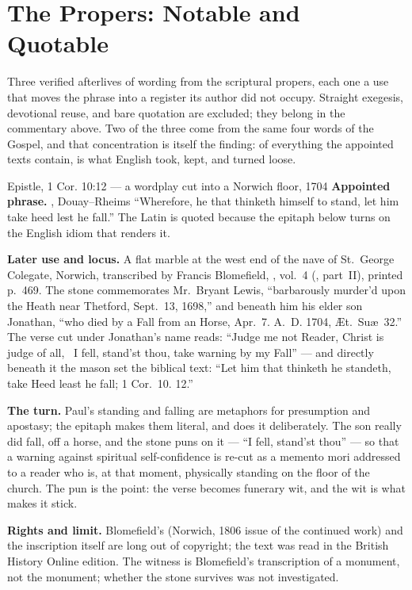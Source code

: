 \sectionguard
\section*{The Propers: Notable and Quotable}

Three verified afterlives of wording from the scriptural propers, each one a
use that moves the phrase into a register its author did not occupy. Straight
exegesis, devotional reuse, and bare quotation are excluded; they belong in
the commentary above. Two of the three come from the same four words of the
Gospel, and that concentration is itself the finding: of everything the
appointed texts contain,  is what English took, kept,
and turned loose.

\begin{afterlife}{Epistle, 1 Cor. 10:12 --- a wordplay cut into a Norwich floor, 1704}
\textbf{Appointed phrase.} , Douay--Rheims ``Wherefore, he that thinketh himself to stand, let him
take heed lest he fall.'' The Latin is quoted because the epitaph below turns
on the English idiom that renders it.

\textbf{Later use and locus.} A flat marble at the west end of the nave of
St.\ George Colegate, Norwich, transcribed by Francis Blomefield, , vol.~4
(, part~II), printed
p.~469. The stone commemorates Mr.\ Bryant Lewis, ``barbarously murder'd upon
the Heath near Thetford, Sept.\ 13, 1698,'' and beneath him his elder son
Jonathan, ``who died by a Fall from an Horse, Apr.\ 7. A.~D. 1704, \AE t.\
Su\ae\ 32.'' The verse cut under Jonathan's name reads: ``Judge me not Reader,
Christ is judge of all, \textbar\ I fell, stand'st thou, take warning by my
Fall'' --- and directly beneath it the mason set the biblical text: ``Let him
that thinketh he standeth, take Heed least he fall; 1 Cor.\ 10. 12.''

\textbf{The turn.} Paul's standing and falling are metaphors for presumption
and apostasy; the epitaph makes them literal, and does it deliberately. The
son really did fall, off a horse, and the stone puns on it --- ``I fell,
stand'st thou'' --- so that a warning against spiritual self-confidence is
re-cut as a memento mori addressed to a reader who is, at that moment,
physically standing on the floor of the church. The pun is the point: the
verse becomes funerary wit, and the wit is what makes it stick.

\textbf{Rights and limit.} Blomefield's  (Norwich, 1806 issue of
the continued work) and the inscription itself are long out of copyright; the
text was read in the British History Online edition. The witness is
Blomefield's transcription of a monument, not the monument; whether the stone
survives was not investigated.
\end{afterlife}

